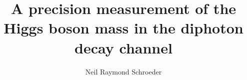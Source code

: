 \phd %

\title{\bf A precision measurement of the Higgs boson mass in the diphoton decay channel}
\author{Neil Raymond Schroeder}


\abstract{}
\copyrightpage %
\acknowledgements{}
\dedication{}


\beforepreface 

\figurespage
\tablespage

\afterpreface            
